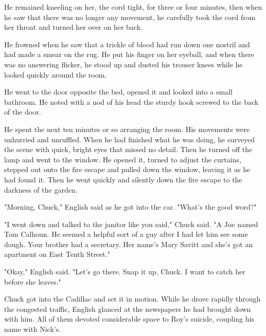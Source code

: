 \documentclass{novel}
\begin{document}
He remained kneeling on her, the cord tight, for three or four minutes, then when he saw that there was no longer any movement, he carefully took the cord from her throat and turned her over on her back.

He frowned when he saw that a trickle of blood had run down one nostril and had made a smear on the rug. He put his finger on her eyeball, and when there was no answering flicker, he stood up and dusted his trouser knees while he looked quickly around the room.

He went to the door opposite the bed, opened it and looked into a small bathroom. He noted with a nod of his head the sturdy hook screwed to the back of the door.

He spent the next ten minutes or so arranging the room. His movements were unhurried and unruffled. When he had finished what he was doing, he surveyed the scene with quick, bright eyes that missed no detail. Then he turned off the lamp and went to the window. He opened it, turned to adjust the curtains, stepped out onto the fire escape and pulled down the window, leaving it as he had found it. Then he went quickly and silently down the fire escape to the darkness of the garden.

\vspace{2\nbs}
\clearpage
\thispagestyle{empty}

\begin{ChapterStart}
\vspace{3\nbs}
\end{ChapterStart}
    
"Morning, Chuck," English said as he got into the car. "What's the good word?"

"I went down and talked to the janitor like you said," Chuck said. "A Joe named Tom Calhoun. He seemed a helpful sort of a guy after I had let him see some dough. Your brother had a secretary. Her name's Mary Savitt and she's got an apartment on East Tenth Street."

"Okay," English said. "Let's go there. Snap it up, Chuck. I want to catch her before she leaves."

Chuck got into the Cadillac and set it in motion. While he drove rapidly through the congested traffic, English glanced at the newspapers he had brought down with him. All of them devoted considerable space to Roy's suicide, coupling his name with Nick's.
\end{document}
